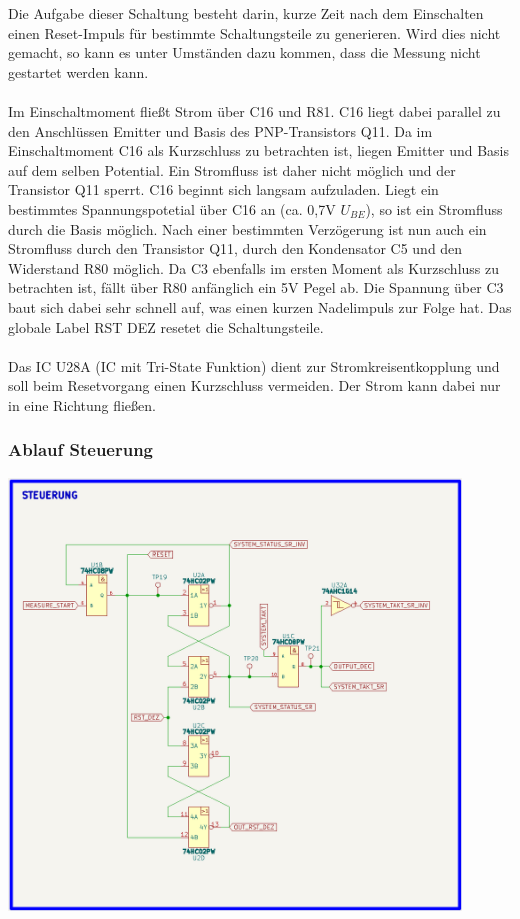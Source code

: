 Die Aufgabe dieser Schaltung besteht darin, kurze Zeit nach dem Einschalten einen Reset-Impuls für bestimmte Schaltungsteile zu generieren. Wird dies nicht gemacht, so kann es unter Umständen dazu kommen, dass die Messung nicht gestartet werden kann.
\\
\\
Im Einschaltmoment fließt Strom über C16 und R81. C16 liegt dabei parallel zu den Anschlüssen \glqq Emitter\grqq{} und \glqq Basis\grqq{} des PNP-Transistors Q11. Da im Einschaltmoment C16 als Kurzschluss zu betrachten ist, liegen Emitter und Basis auf dem selben Potential. Ein Stromfluss ist daher nicht möglich und der Transistor Q11 sperrt. C16 beginnt sich langsam aufzuladen. Liegt ein bestimmtes Spannungspotetial über C16 an (ca. 0,7V $U_{BE}$), so ist ein Stromfluss durch die Basis möglich. Nach einer bestimmten Verzögerung ist nun auch ein Stromfluss durch den Transistor Q11, durch den Kondensator C5 und den Widerstand R80 möglich. Da C3 ebenfalls im ersten Moment als Kurzschluss zu betrachten ist, fällt über R80 anfänglich ein 5V Pegel ab. Die Spannung über C3 baut sich dabei sehr schnell auf, was einen kurzen Nadelimpuls zur Folge hat. Das globale Label \glqq RST DEZ\grqq{} resetet die Schaltungsteile.  
\\
\\
Das IC U28A (IC mit Tri-State Funktion) dient zur Stromkreisentkopplung und soll beim Resetvorgang einen Kurzschluss vermeiden. Der Strom kann dabei nur in eine Richtung fließen.

\newpage
\subsubsection{Ablauf Steuerung}

\begin{center}
\includegraphics[width=12cm]{Bilder/Controlling.png}
\end{center}

